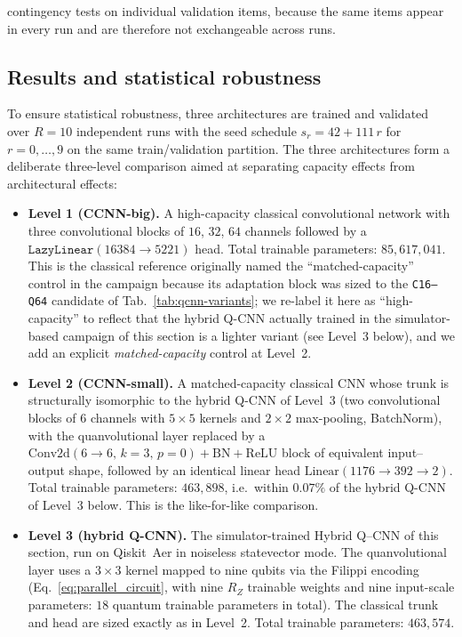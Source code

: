 contingency tests on individual validation items, because the same items
appear in every run and are therefore not exchangeable across runs.

\subsection{Results and statistical robustness}
\label{sec:results-stats}

To ensure statistical robustness, three architectures are trained and
validated over $R=10$ independent runs with the seed schedule
$s_{r} = 42 + 111\,r$ for $r=0,\dots,9$ on the same train/validation
partition. The three architectures form a deliberate three-level
comparison aimed at separating capacity effects from architectural
effects:
\begin{itemize}
\item \textbf{Level 1 (CCNN-big).} A high-capacity classical convolutional
network with three convolutional blocks of $16$, $32$, $64$ channels
followed by a $\texttt{LazyLinear}(16384{\to}5221)$ head. Total trainable
parameters: $85{,}617{,}041$. This is the classical reference originally
named the ``matched-capacity'' control in the campaign because its
adaptation block was sized to the \texttt{C16--Q64} candidate of
Tab.~\ref{tab:qcnn-variants}; we re-label it here as ``high-capacity'' to
reflect that the hybrid Q-CNN actually trained in the simulator-based
campaign of this section is a lighter variant (see Level~3 below), and we
add an explicit \emph{matched-capacity} control at Level~2.
\item \textbf{Level 2 (CCNN-small).} A matched-capacity classical CNN
whose trunk is structurally isomorphic to the hybrid Q-CNN of Level~3
(two convolutional blocks of $6$ channels with $5{\times}5$ kernels and
$2{\times}2$ max-pooling, BatchNorm), with the quanvolutional layer
replaced by a $\mathrm{Conv2d}(6{\to}6,\,k{=}3,\,p{=}0)+\mathrm{BN}+\mathrm{ReLU}$
block of equivalent input--output shape, followed by an identical linear
head $\mathrm{Linear}(1176{\to}392{\to}2)$. Total trainable parameters:
$463{,}898$, i.e.\ within $0.07\%$ of the hybrid Q-CNN of Level~3 below.
This is the like-for-like comparison.
\item \textbf{Level 3 (hybrid Q-CNN).} The simulator-trained Hybrid
Q--CNN of this section, run on Qiskit~Aer in noiseless statevector mode.
The quanvolutional layer uses a $3{\times}3$ kernel mapped to nine
qubits via the Filippi encoding (Eq.~\ref{eq:parallel_circuit}, with
nine $R_Z$ trainable weights and nine input-scale parameters: $18$
quantum trainable parameters in total). The classical trunk and head are
sized exactly as in Level~2. Total trainable parameters: $463{,}574$.
\end{itemize}
